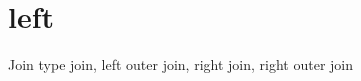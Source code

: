 \hypertarget{left-example}{}\section{left}
Join type join\textquotesingle{}, \textquotesingle{}left outer join\textquotesingle{}, \textquotesingle{}right join\textquotesingle{}, \textquotesingle{}right outer join\textquotesingle{}


\begin{DoxyCodeInclude}
\end{DoxyCodeInclude}
 